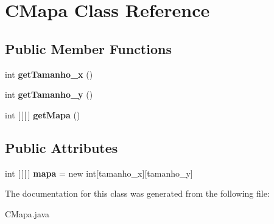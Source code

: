 \section{C\+Mapa Class Reference}
\label{class_c_mapa}
\subsection*{Public Member Functions}
\begin{DoxyCompactItemize}
\item 
\mbox{\label{class_c_mapa_a0e2ce13fe70532d58ccec1426c7158ed}} 
int {\bfseries get\+Tamanho\+\_\+x} ()
\item 
\mbox{\label{class_c_mapa_ae67c4f80ab5a8d149b608c683f50013f}} 
int {\bfseries get\+Tamanho\+\_\+y} ()
\item 
\mbox{\label{class_c_mapa_a185cec3188d7e99f7ab61486e484e330}} 
int [$\,$][$\,$] {\bfseries get\+Mapa} ()
\end{DoxyCompactItemize}
\subsection*{Public Attributes}
\begin{DoxyCompactItemize}
\item 
\mbox{\label{class_c_mapa_a2ac03e8f12d13cd934d5a6ada5d0daf4}} 
int [$\,$][$\,$] {\bfseries mapa} = new int[tamanho\+\_\+x][tamanho\+\_\+y]
\end{DoxyCompactItemize}


The documentation for this class was generated from the following file\+:\begin{DoxyCompactItemize}
\item 
C\+Mapa.\+java\end{DoxyCompactItemize}
